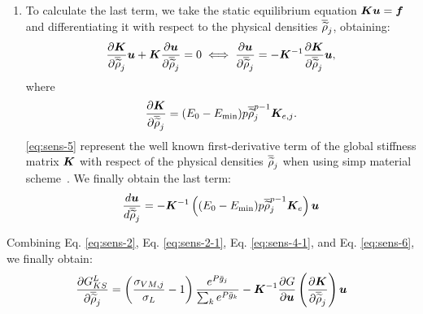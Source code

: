 \begin{enumerate}[label=\Alph* -]
    \item To calculate the last term, we take the static equilibrium equation $\bm{K}\bm{u} = \bm{f}$ and differentiating it with respect to the physical densities $\overline{\widetilde{\rho}}_j$, obtaining:
    \begin{equation}
        \frac{\partial\bm{K}}{\partial\overline{\widetilde{\rho}}_j}\bm{u} + \bm{K}\frac{\partial\bm{u}}{\partial\overline{\widetilde{\rho}}_j} = 0 \iff \frac{\partial\bm{u}}{\partial\overline{\widetilde{\rho}}_j} = -\bm{K}^{-1}\frac{\partial\bm{K}}{\partial\overline{\widetilde{\rho}}_j}\bm{u},
    \end{equation}
    where
    \begin{equation}
        \label{eq:sens-5}
        \frac{\partial\bm{K}}{\partial\overline{\widetilde{\rho}}_{j}} = (E_0-E_{\textrm{min}}) p\overline{\widetilde{\rho}}_j^{p-1} \bm{K}_{e,j}.
    \end{equation}
    \eqref{eq:sens-5} represent the well known first-derivative term of the global stiffness matrix $\bm{K}$ with respect of the physical densities $\overline{\widetilde{\rho}}_j$ when using \gls{simp} material scheme~. We finally obtain the last term:
    \begin{equation} \label{eq:sens-6}
        \frac{d \bm{u} }{d \overline{\widetilde{\rho}}_j} = - \bm{K}^{-1} \left((E_0-E_{\textrm{min}}) p\overline{\widetilde{\rho}}_j^{p-1} \bm{K}_e \right) \bm{u}
    \end{equation}
\end{enumerate}

Combining Eq. \ref{eq:sens-2}, Eq. \ref{eq:sens-2-1}, Eq. \ref{eq:sens-4-1}, and Eq. \ref{eq:sens-6}, we finally obtain:
\begin{equation}
\frac{\partial G_{KS}^L}{\partial\overline{\widetilde{\rho}}_j} = \left(\frac{ \sigma_{VM,j}}{\sigma_L}-1 \right) \frac{e^{{P}\bar{g}_j}}{\sum_k e^{{P}\bar{g}_k}} - 
\bm{K}^{-1}\frac{\partial G}{\partial\bm{u}} \left(\frac{\partial\bm{K}}{\partial\overline{\widetilde{\rho}}_{j}} \right) \bm{u}
\end{equation}

